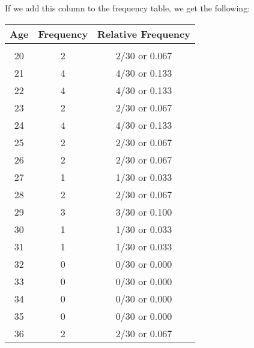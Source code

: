 If we add this column to the frequency table, we get the following:
\begin{center}
\begin{tabular}{c c c}
\textbf{Age} & \textbf{Frequency} & \textbf{Relative Frequency}\\
\hline
& & \\
20 & 2 & 2/30 or 0.067\\
21 & 4 & 4/30 or 0.133\\
22 & 4 & 4/30 or 0.133\\
23 & 2 & 2/30 or 0.067\\
24 & 4 & 4/30 or 0.133\\
25 & 2 & 2/30 or 0.067\\
26 & 2 & 2/30 or 0.067\\
27 & 1 & 1/30 or 0.033\\
28 & 2 & 2/30 or 0.067\\
29 & 3 & 3/30 or 0.100\\
30 & 1 & 1/30 or 0.033\\
31 & 1 & 1/30 or 0.033\\
32 & 0 & 0/30 or 0.000\\
33 & 0 & 0/30 or 0.000\\
34 & 0 & 0/30 or 0.000\\
35 & 0 & 0/30 or 0.000\\
36 & 2 & 2/30 or 0.067
\end{tabular}
\end{center}

